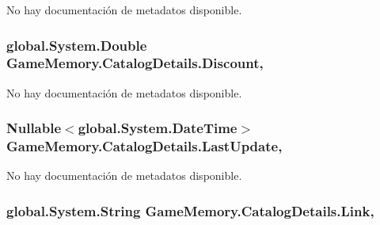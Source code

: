 No hay documentación de metadatos disponible. 

\hypertarget{class_game_memory_1_1_catalog_details_aed76f865302ee9147bffc9fec748bb5f}{
\subsubsection[{Discount}]{\setlength{\rightskip}{0pt plus 5cm}global.\-System.\-Double Game\-Memory.\-Catalog\-Details.\-Discount\hspace{0.3cm}{\ttfamily [get]}, {\ttfamily [set]}}}\label{class_game_memory_1_1_catalog_details_aed76f865302ee9147bffc9fec748bb5f}


No hay documentación de metadatos disponible. 

\hypertarget{class_game_memory_1_1_catalog_details_a4df71c93f6a92d08c3073b0e5d5a53e4}{
\subsubsection[{Last\-Update}]{\setlength{\rightskip}{0pt plus 5cm}Nullable$<$global.\-System.\-Date\-Time$>$ Game\-Memory.\-Catalog\-Details.\-Last\-Update\hspace{0.3cm}{\ttfamily [get]}, {\ttfamily [set]}}}\label{class_game_memory_1_1_catalog_details_a4df71c93f6a92d08c3073b0e5d5a53e4}


No hay documentación de metadatos disponible. 

\hypertarget{class_game_memory_1_1_catalog_details_ad9b810e2b2a259a71e5ffa8b83bbe47c}{
\subsubsection[{Link}]{\setlength{\rightskip}{0pt plus 5cm}global.\-System.\-String Game\-Memory.\-Catalog\-Details.\-Link\hspace{0.3cm}{\ttfamily [get]}, {\ttfamily [set]}}}\label{class_game_memory_1_1_catalog_details_ad9b810e2b2a259a71e5ffa8b83bbe47c}


